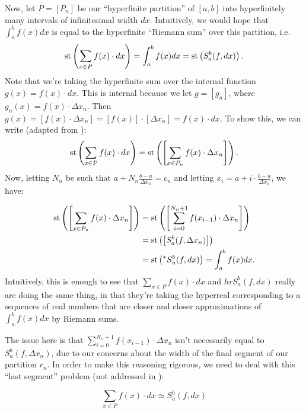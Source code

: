 Now, let $P = [P_n]$ be our ``hyperfinite partition'' of $[a,b]$ into hyperfinitely many intervals of infinitesimal width $dx$. Intuitively, we would hope that $\int_a^b f(x)dx$ is equal to the hyperfinite ``Riemann sum'' over this partition, i.e.
\[
\operatorname{st}\left(\sum_{x \in P} f(x) \cdot dx\right) = \int_a^b f(x)dx = \operatorname{st}\left(S_a^b(f, dx)\right).
\]
Note that we're taking the hyperfinite sum over the internal function $g(x) = f(x) \cdot dx$. This is internal because we let $g = [g_n]$, where $g_n(x) = f(x) \cdot \Delta x_n$. Then $g(x) = [f(x) \cdot \Delta x_n] = [f(x)] \cdot [\Delta x_n] = f(x) \cdot dx$. To show this, we can write (adapted from \cite[Chapter~12.7]{goldblatt1998}):
\[
\operatorname{st}\left(\sum_{x \in P} f(x) \cdot dx \right)= \operatorname{st}\left(\left[\sum_{x \in P_n} f(x) \cdot \Delta x_n\right]\right) .
\]
Now, letting $N_n$ be such that $a + N_n \frac{b-a}{\Delta x_n} = c_n$ and letting $x_i = a + i \cdot \frac{b-a}{\Delta x_n}$, we have:

\begin{align*}
\operatorname{st}\left(\left[\sum_{x \in P_n} f(x) \cdot \Delta x_n\right]\right) &= \operatorname{st}\left(\left[\sum_{i=0}^{N_n+1} f(x_{i-1}) \cdot \Delta x_n\right]\right) \\
    &= \operatorname{st}\left(\left[ S_a^b(f, \Delta x_n) \right]\right) \\
    &= \operatorname{st}\left(\prescript{*}{}{S}_a^b(f, dx)\right) = \int_a^b f(x)dx.
\end{align*}
Intuitively, this is enough to see that $\sum_{x \in P} f(x) \cdot dx$ and $hr{S}_a^b(f, dx)$ really are doing the same thing, in that they're taking the hyperreal corresponding to a sequences of real numbers that are closer and closer approximations of $\int_a^b f(x)dx$ by Riemann sums. 

The issue here is that $\sum_{i=0}^{N_n+1} f(x_{i-1}) \cdot \Delta x_n$ isn't necessarily equal to $S_a^b(f, \Delta x_n)$, due to our concerns about the width of the final segment of our partition $r_n$. In order to make this reasoning rigorous, we need to deal with this ``last segment'' problem (not addressed in \cite{goldblatt1998}):

\begin{lemma}
    \[ \sum_{x \in P} f(x) \cdot dx \simeq S_a^b(f, dx) \]
\end{lemma}

